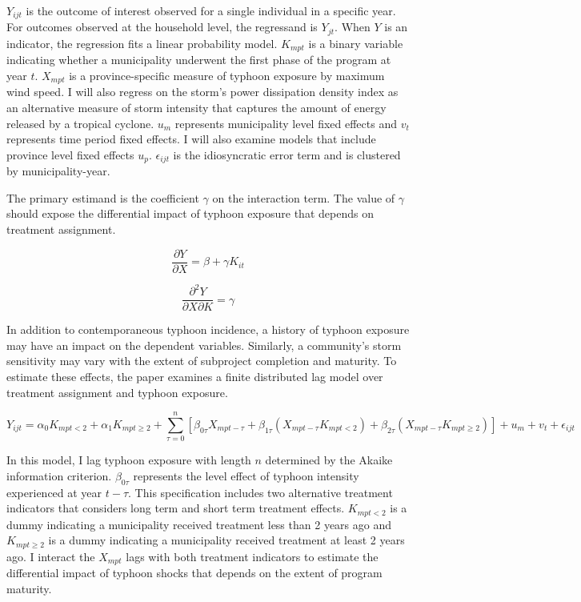 \documentclass[12pt]{article}
\begin{document}
	$Y_{ijt}$ is the outcome of interest observed for a single individual in a specific year. For outcomes observed at the household level, the regressand is $Y_{jt}$. When $Y$ is an indicator, the regression fits a linear probability model. $K_{mpt}$ is a binary variable indicating whether a municipality underwent the first phase of the program at year $t$. $X_{mpt}$ is a province-specific measure of typhoon exposure by maximum wind speed. I will also regress on the storm's power dissipation density index as an alternative measure of storm intensity that captures the amount of energy released by a tropical cyclone. $u_{m}$ represents municipality level fixed effects and $v_{t}$ represents time period fixed effects. I will also examine models that include province level fixed effects $u_{p}$. $\epsilon_{ijt}$ is the idiosyncratic error term and is clustered by municipality-year.


	The primary estimand is the coefficient $\gamma$ on the interaction term. The value of $\gamma$ should expose the differential impact of typhoon exposure that depends on treatment assignment. 

	\[\frac{\partial Y}{\partial X} = \beta + \gamma K_{it}\]

	\[\frac{\partial^2 Y}{\partial X \partial K} = \gamma\] 

	In addition to contemporaneous typhoon incidence, a history of typhoon exposure may have an impact on the dependent variables. Similarly, a community's storm sensitivity may vary with the extent of subproject completion and maturity. To estimate these effects, the paper examines a finite distributed lag model over treatment assignment and typhoon exposure.

	\[Y_{ijt} = \alpha_0 K_{mpt < 2} + 
				\alpha_1 K_{mpt \geq 2} +
				\sum_{\tau = 0}^{n} \left[\beta_{0\tau} X_{mpt - \tau} +
									\beta_{1\tau} (X_{mpt - \tau} K_{mpt < 2}) + 
									\beta_{2\tau} (X_{mpt - \tau} K_{mpt \geq 2}) \right] + 
				u_{m} + 
				v_{t} + 
				\epsilon_{ijt}\]

	In this model, I lag typhoon exposure with length $n$ determined by the Akaike information criterion. $\beta_{0\tau}$ represents the level effect of typhoon intensity experienced at year $t - \tau$. This specification includes two alternative treatment indicators that considers long term and short term treatment effects. $K_{mpt < 2}$ is a dummy indicating a municipality received treatment less than 2 years ago and $K_{mpt \geq 2}$ is a dummy indicating a municipality received treatment at least 2 years ago. I interact the $X_{mpt}$ lags with both treatment indicators to estimate the differential impact of typhoon shocks that depends on the extent of program maturity.
\end{document}
